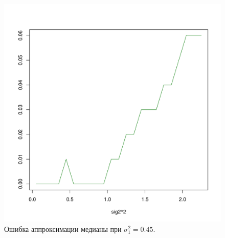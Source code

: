 \documentclass[12pt]{article}
\begin{document}
	\begin{figure}[!hhh]
		\begin{center}
			\begin{minipage}[h]{0.8\linewidth}
				\includegraphics[width=1\linewidth]{img/gr_new_1.pdf}
				\caption{Ошибка аппроксимации медианы при $\sigma_{1}^{2} = 0.45$.} %
				\label{ris7} %
			\end{minipage}	
		\end{center}
	\end{figure}
\end{document}
